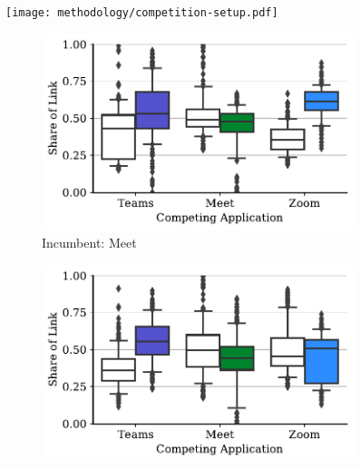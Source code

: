 \begin{figure}[]
   \centering
    \texttt{[image: methodology/competition-setup.pdf]}
    \caption{}
    \label{fig:competition-setup}
\end{figure}


\begin{figure}[t!]
    \centering
    \begin{subfigure}[t]{.33\textwidth}
        \centering
        \includegraphics[width=1\textwidth]{figures/comp/box_plot_meet_ul_0.5_all.pdf}
        \caption{Incumbent: Meet}
        \label{fig:meet_ul_box}
    \end{subfigure}\hfill
    \begin{subfigure}[t]{.33\textwidth}
        \centering
        \includegraphics[width=1\textwidth]{figures/comp/box_plot_teams_ul_0.5_all.pdf}

\end{subfigure}
\end{figure}
